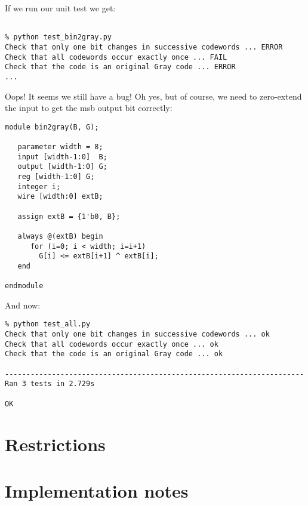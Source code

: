 If we run our unit test we get:

\begin{verbatim}

% python test_bin2gray.py   
Check that only one bit changes in successive codewords ... ERROR
Check that all codewords occur exactly once ... FAIL
Check that the code is an original Gray code ... ERROR
...

\end{verbatim}

Oops! It seems we still have a bug! Oh yes, but of course, 
we need to zero-extend the input to get the msb output bit
correctly:

\begin{verbatim}
module bin2gray(B, G);

   parameter width = 8;
   input [width-1:0]  B;
   output [width-1:0] G;
   reg [width-1:0] G;
   integer i;
   wire [width:0] extB;

   assign extB = {1'b0, B};

   always @(extB) begin
      for (i=0; i < width; i=i+1)
        G[i] <= extB[i+1] ^ extB[i];
   end

endmodule

\end{verbatim}

And now:

\begin{verbatim}
% python test_all.py 
Check that only one bit changes in successive codewords ... ok
Check that all codewords occur exactly once ... ok
Check that the code is an original Gray code ... ok

----------------------------------------------------------------------
Ran 3 tests in 2.729s

OK

\end{verbatim}


\section{Restrictions}






\section{Implementation notes}





 

